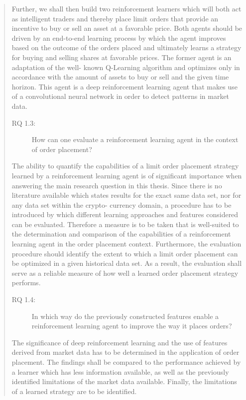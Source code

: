 \begin{quote}
    Further, we shall then build two reinforcement learners which will both act as intelligent traders and thereby place limit orders that provide an incentive to buy or sell an asset at a favorable price.
    Both agents should be driven by an end-to-end learning process by which the agent improves based on the outcome of the orders placed and ultimately learns a strategy for  buying and selling shares at favorable prices.
    The former agent is an adaptation of the well- known Q-Learning algorithm and optimizes only in accordance with the amount of assets to buy or sell and the given time horizon.
    This agent is a deep reinforcement learning agent that makes use of a convolutional neural network in order to detect patterns in market data.

\begin{description}
    \item[RQ 1.3:] How can one evaluate a reinforcement learning agent in the context of order placement?
\end{description}
    The ability to quantify the capabilities of a limit order placement strategy learned by a reinforcement learning agent is of significant importance when answering the main research question in this thesis.
    Since there is no literature available which states results for the exact same data set, nor for any data set within the crypto- currency domain, a procedure has to be introduced by which different learning approaches and features considered can be evaluated.
    Therefore a measure is to be taken that is well-suited to the determination and comparison of the capabilities of a reinforcement learning agent in the order placement context.
    Furthermore, the evaluation procedure should identify the extent to which a limit order placement can be optimized in a given historical data set.
    As a result, the evaluation shall serve as a reliable measure of how well a learned order placement strategy performs.
    
\begin{description}
    \item[RQ 1.4:] In which way do the previously constructed features enable a reinforcement learning agent to improve the way it places orders?
\end{description}

    The significance of deep reinforcement learning and the use of features derived from market data has to be determined in the application of order placement.
    The findings shall be compared to the performance achieved by a learner which has less information available, as well as the previously identified limitations of the market data available.
    Finally, the limitations of a learned strategy are to be identified.
\end{quote}

